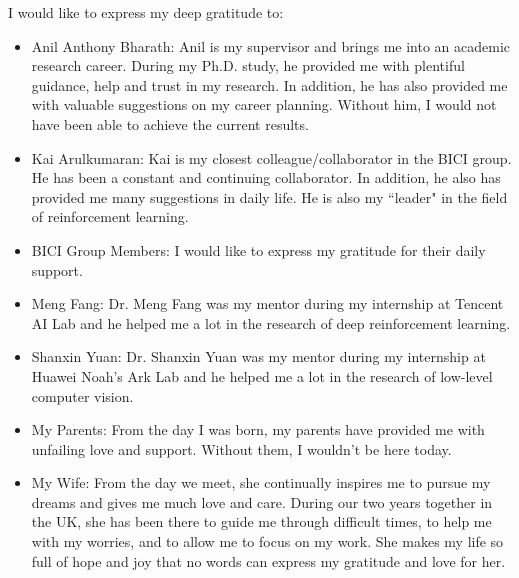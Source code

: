 
\cleardoublepage


\begin{acknowledgements}

I would like to express my deep gratitude to:

\begin{itemize}
 \item Anil Anthony Bharath: Anil is my supervisor and brings me into an academic research career. During my Ph.D. study, he provided me with plentiful guidance, help and trust in my research. In addition, he has also provided me with valuable suggestions on my career planning. Without him, I would not have been able to achieve the current results.
 \vspace*{3mm}
 \item Kai Arulkumaran: Kai is my closest colleague/collaborator in the BICI group. He has been a constant and continuing collaborator. In addition, he also has provided me many suggestions in daily life. He is also my ``leader" in the field of reinforcement learning.
 \vspace*{3mm}
 \item BICI Group Members: I would like to express my gratitude for their daily support.
 \vspace*{3mm}
 \item Meng Fang: Dr. Meng Fang was my mentor during my internship at Tencent AI Lab and he helped me a lot in the research of deep reinforcement learning.
 \item Shanxin Yuan: Dr. Shanxin Yuan was my mentor during my internship at Huawei Noah's Ark Lab and he helped me a lot in the research of low-level computer vision.
 \vspace*{3mm}
 \item My Parents: From the day I was born, my parents have provided me with unfailing love and support. Without them, I wouldn't be here today.
 \vspace*{3mm}
 \item My Wife: From the day we meet, she continually inspires me to pursue my dreams and gives me much love and care. During our two years together in the UK, she has been there to guide me through difficult times, to help me with my worries, and to allow me to focus on my work. She makes my life so full of hope and joy that no words can express my gratitude and love for her.
\end{itemize}

\end{acknowledgements}
